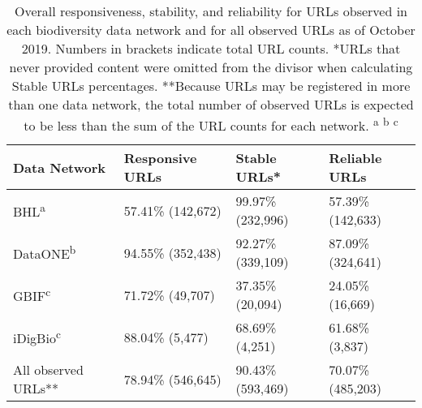 \begin{table}[!ht]
\begin{adjustwidth}{0in}{0in} %
\centering
\begin{tabular}{llll}
\hline
{\bf Data Network} & {\bf Responsive URLs} & {\bf Stable URLs*} & {\bf Reliable URLs} \\ \hline
BHL\textsuperscript{a} & 57.41\% (142,672) & 99.97\% (232,996) & 57.39\% (142,633) \\
DataONE\textsuperscript{b} & 94.55\% (352,438) & 92.27\% (339,109) & 87.09\% (324,641) \\
GBIF\textsuperscript{c} & 71.72\% (49,707) & 37.35\% (20,094) & 24.05\% (16,669) \\
iDigBio\textsuperscript{c} & 88.04\% (5,477) & 68.69\% (4,251) & 61.68\% (3,837)  \\
All observed URLs** & 78.94\% (546,645) & 90.43\% (593,469) & 70.07\% (485,203) \\ \hline
\end{tabular}
\caption{Overall responsiveness, stability, and reliability for URLs observed in each biodiversity data network and for all observed URLs as of October 2019. Numbers in brackets indicate total URL counts.
*URLs that never provided content were omitted from the divisor when calculating Stable URLs percentages.
**Because URLs may be registered in more than one data network, the total number of observed URLs is expected to be less than the sum of the URL counts for each network.
\textsuperscript{a}\citet{poelen_jorrit_h_2019_3484555}
\textsuperscript{b}\citet{poelen_jorrit_h_2019_3483218}
\textsuperscript{c}\citet{poelen_jorrit_h_2019_3484205}
}
\label{table1}
\end{adjustwidth}
\end{table}
